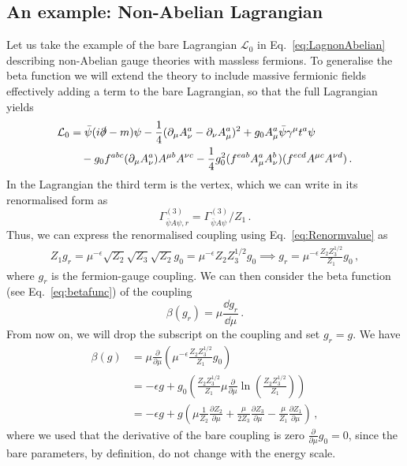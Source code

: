 \subsection{An example: Non-Abelian Lagrangian}
Let us take the example of the bare Lagrangian $\mathcal{L}_\mathrm{0}$ in Eq.~\eqref{eq:LagnonAbelian} describing non-Abelian gauge theories with massless fermions. To generalise the beta function we will extend the theory to include massive fermionic fields effectively adding a term to the bare Lagrangian, so that the full Lagrangian yields \cite{Peskin:1995ev}
\begin{align}
     \mathcal{L}_\mathrm{0} &= \bar{\psi}(i \slashed{\partial} - m)\psi - \frac{1}{4}(\partial_\mu A_\nu^a - \partial_\nu A_\mu^a)^2 + g_0 A_\mu^a \bar{\psi} \gamma^\mu t^a \psi\nonumber \\&\quad- g_0 f^{abc} (\partial_\mu A_\nu^a) A^{\mu b} A^{\nu c} - \frac{1}{4} g_0^2 (f^{eab} A_\mu^a A_\nu^b)(f^{ecd} A^{\mu c} A^{\nu d})\,.\label{eq:LnonA}
\end{align}
In the Lagrangian the third term is the vertex, which we can write in its renormalised form as
\begin{equation}
    \Gamma_{\bar{\psi} A \psi, r}^{(3)} = \Gamma_{\bar{\psi} A \psi}^{(3)} / Z_1 \,.
\end{equation}
Thus, we can express the renormalised coupling using Eq.~\eqref{eq:Renormvalue} as 
\begin{align}
    Z_1 g_r =\mu^{-\epsilon} \sqrt{Z_2} \sqrt{Z_3} \sqrt{Z_2} g_0 = \mu^{-\epsilon} Z_2 Z_3^{1/2} g_0 \implies g_r = \mu^{-\epsilon}\frac{Z_2 Z_3^{1/2}}{Z_1} g_0 \,,
\end{align}
where $g_r$ is the fermion-gauge coupling. We can then consider the beta function (see Eq.~\eqref{eq:betafunc}) of the coupling
\begin{equation}
    \beta(g_r) = \mu \frac{\dd g_r}{\dd\mu}\,.
\end{equation}
From now on, we will drop the subscript on the coupling and set $g_r = g$. We have
\begin{align}
    \beta(g)  &= \mu \frac{\partial}{\partial\mu} \left(\mu^{-\epsilon} \frac{Z_2 Z_3^{1/2}}{Z_1} g_0 \right)\nonumber \\
    &=-\epsilon g +g_0 \left( \frac{Z_2 Z_3^{1/2}}{Z_1} \mu \frac{\partial}{\partial\mu} \ln\left( \frac{Z_2 Z_3^{1/2}}{Z_1} \right) \right) \nonumber\\
    &= -\epsilon g+g \left( \mu \frac{1}{Z_2} \frac{\partial Z_2}{\partial\mu} + \frac{\mu}{2 Z_3} \frac{\partial Z_3}{\partial\mu} - \frac{\mu}{Z_1} \frac{\partial Z_1}{\partial\mu} \right)\,,
\end{align}
where we used that the derivative of the bare coupling is zero $\frac{\partial}{\partial\mu} g_0 = 0$, since the bare parameters, by definition, do not change with the energy scale. 

